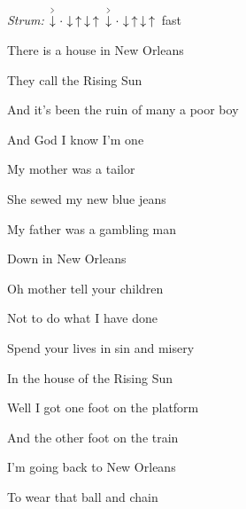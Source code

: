 \begin{song}


\begin{headerbox}
 \quad
\textit{Strum:} $\AccentDown\Miss\Down\Up\Down\Up\ \AccentDown\Miss\Down\Up\Down\Up$ fast
\end{headerbox}

\begin{hchordbox}
\end{hchordbox}

\Large

\bigskip

    \par
{}    \par

\bigskip

There is a house in New Orleans  \par
They call the Rising Sun  \par
And it’s been the ruin of many a poor boy  \par
And God I know I’m one  \par

\bigskip

My mother was a tailor  \par
She sewed my new blue jeans  \par
My father was a gambling man \par
{}Down in New Orleans  \par

\bigskip

Oh mother tell your children  \par
Not to do what I have done  \par
{}Spend your lives in sin and misery \par
In the house of the Rising Sun  \par

\bigskip

Well I got one foot  on the platform  \par
And the other foot on the train  \par
I’m going back to New Orleans  \par
To wear that ball and chain  \par


\end{song}

